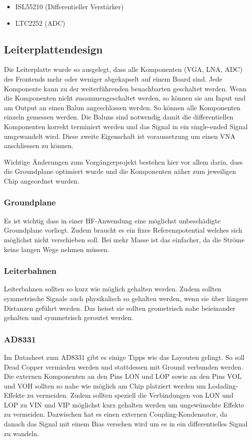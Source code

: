 \begin{itemize}  
	\item ISL55210 (Differentieller Verstärker)
	\item LTC2252 (ADC)
\end{itemize}

\clearpage
\subsection{Leiterplattendesign}
\label{subsec:Leiterplattendesign}
Die Leiterplatte wurde so ausgelegt, dass alle Komponenten (VGA, LNA, ADC) des Frontends mehr oder weniger abgekapselt auf einem Board sind. Jede Komponente kann zu der weiterführenden benachbarten geschaltet werden. Wenn die Komponenten nicht zusammengeschaltet werden, so können sie am Input und am Output an einen Balun angeschlossen werden. So können alle Komponenten einzeln gemessen werden. Die Baluns sind notwendig damit die differentiellen Komponenten korrekt terminiert werden und das Signal in ein single-ended Signal umgewandelt wird. Diese zweite Eigenschaft ist voraussetzung um einen VNA anschliessen zu können.

Wichtige Änderungen zum Vorgängerprojekt bestehen hier vor allem darin, dass die Groundplane optimiert wurde und die Komponenten näher zum jeweiligen Chip angeordnet wurden.

\subsubsection*{Groundplane}
Es ist wichtig dass in einer HF-Anwendung eine möglichst unbeschädigte Groundplane vorliegt. Zudem braucht es ein fixes Referenzpotential welches sich möglichst nicht verschieben soll. Bei mehr Masse ist das einfacher, da die Ströme keine langen Wege nehmen müssen.

\subsubsection*{Leiterbahnen}
Leiterbahnen sollten so kurz wie möglich gehalten werden. Zudem sollten symmetrische Signale auch physikalisch so gehalten werden, wenn sie über längere Distanzen geführt werden. Das heisst sie sollten geometrisch nahe beieinander gehalten und symmetrisch geroutet werden. 

\subsubsection*{AD8331}
Im Datasheet zum AD8331 gibt es einige Tipps wie das Layouten gelingt. So soll Dead Copper vermieden werden und stattdessen mit Ground verbunden werden.
Die externen Komponenten an den Pins LON und LOP sowie an den Pins VOL und VOH sollten so nahe wie möglich am Chip platziert werden um Lodading-Effekte zu vermeiden.
Zudem sollten speziell die Verbindungen von LON und LOP zu VIN und VIP möglichst kurz gehalten werden um ungewünschte Effekte zu vermeiden. Dazwischen hat es einen externen Coupling-Kondensator, da danach das Signal mit einem Bias versehen wird um es in ein differentielles Signal zu wandeln.

